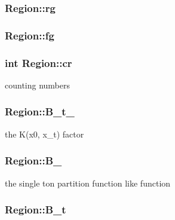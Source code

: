 \subsubsection{ {\bf Region::rg}\hspace{0.3cm}{\tt  [private]}}\label{classRegion_1552a23bb35f95a0a97b85dabf7a0f54}


\subsubsection{ {\bf Region::fg}\hspace{0.3cm}{\tt  [private]}}\label{classRegion_2f1303a9987ee78dceb94ebba241edce}


\subsubsection{\setlength{\rightskip}{0pt plus 5cm}int {\bf Region::cr}}\label{classRegion_13f0d90fdd83e32cbd04ed554f936498}


counting numbers 

\subsubsection{ {\bf Region::B\_\-t\_}}\label{classRegion_0028b144d2271354d7c20135e71384ec}


the K(x0, x\_\-t) factor 

\subsubsection{ {\bf Region::B\_}}\label{classRegion_1cb30594513f666c975a19380c7fd1bc}


the single ton partition function like function 

\subsubsection{ {\bf Region::B\_\-t}}\label{classRegion_255fe5857dd92b7add121b73e43f992e}


